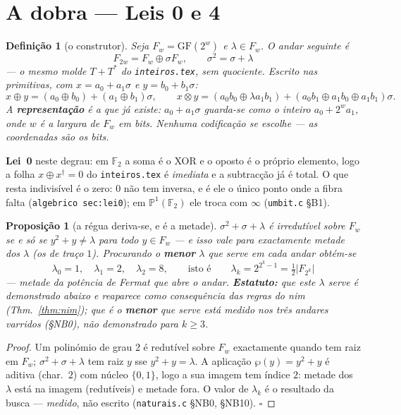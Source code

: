 \documentclass[11pt,a4paper]{article}
\newtheorem{proposicao}[teorema]{Proposição}
\newtheorem{definicao}{Definição}
\newcommand{\code}[1]{\texttt{\small #1}}
\newcommand{\dg}{^{\dagger}}
\newcommand{\FF}{\mathbb{F}}
\begin{document}
\section{A dobra --- Leis 0 e 4}\label{sec:dobra}

\begin{definicao}[o construtor]\label{def:dobra}
Seja $F_w=\mathrm{GF}(2^{w})$ e $\lambda\in F_w$. O andar seguinte é
\[
\boxed{\;F_{2w}=F_w\oplus\sigma F_w,\qquad \sigma^{2}=\sigma+\lambda\;}
\]
--- o \emph{mesmo} molde $T+T^{*}$ do \code{inteiros.tex}, sem quociente. Escrito
nas primitivas, com $x=a_0+a_1\sigma$ e $y=b_0+b_1\sigma$:
\[
x\oplus y=(a_0\oplus b_0)+(a_1\oplus b_1)\sigma,
\qquad
x\otimes y=(a_0b_0\oplus\lambda a_1b_1)+(a_0b_1\oplus a_1b_0\oplus a_1b_1)\sigma .
\]
A \textbf{representação} é a que já existe: $a_0+a_1\sigma$ guarda-se como o
inteiro $a_0+2^{w}a_1$, onde $w$ é a largura de $F_w$ em bits. Nenhuma codificação se
escolhe --- as coordenadas \emph{são} os bits.
\end{definicao}

\noindent\textbf{Lei~0} neste degrau: em $\FF_2$ a soma é o XOR e o oposto é o
próprio elemento, logo a folha $x\oplus x\dg=0$ do \code{inteiros.tex} é
\emph{imediata} e a subtracção já é total. O que resta indivisível é o zero:
$0$ não tem inversa, e é ele o único ponto onde a fibra falta
(\code{algebrico sec:lei0}); em $\mathbb{P}^1(\FF_2)$ ele troca com $\infty$
(\code{umbit.c} §B1).

\begin{proposicao}[a régua deriva-se, e é a metade]\label{prop:regua}
$\sigma^{2}+\sigma+\lambda$ é irredutível sobre $F_w$ se e só se
$y^{2}+y\neq\lambda$ para todo $y\in F_w$ --- e isso vale para exactamente
metade dos $\lambda$ (os de traço $1$). Procurando o \textbf{menor} $\lambda$
que serve em cada andar obtém-se
\[
\boxed{\;\lambda_0=1,\quad\lambda_1=2,\quad\lambda_2=8,
\qquad\text{isto é}\qquad \lambda_k=2^{2^{k}-1}=\tfrac{1}{2}\lvert F_{2^{k}}\rvert\;}
\]
--- metade da potência de Fermat que abre o andar. \textbf{Estatuto:} que este
$\lambda$ \emph{serve} é demonstrado abaixo e reaparece como consequência das
regras do \emph{nim} (Thm.~\ref{thm:nim}); que é o \textbf{menor} que serve está
\emph{medido} nos três andares varridos (§NB0), não demonstrado para $k\ge3$.
\end{proposicao}

\begin{proof}
Um polinómio de grau $2$ é redutível sobre $F_w$ exactamente quando tem raiz em
$F_w$; $\sigma^2+\sigma+\lambda$ tem raiz $y$ sse $y^2+y=\lambda$. A aplicação
$\wp(y)=y^2+y$ é aditiva (char.~$2$) com núcleo $\{0,1\}$, logo a sua imagem
tem índice $2$: metade dos $\lambda$ está na imagem (redutíveis) e metade fora.
O valor de $\lambda_k$ é o resultado da busca --- \emph{medido}, não escrito
(\code{naturais.c} §NB0, §NB10). $\square$
\end{proof}
\end{document}
